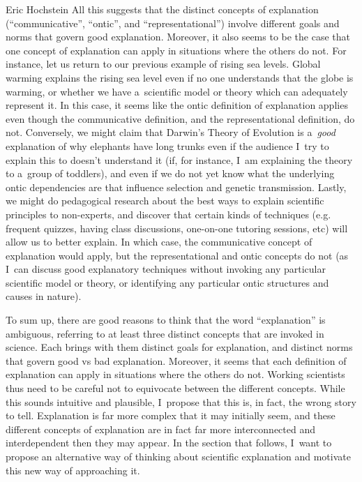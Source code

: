 \begin{artengenv}{Eric Hochstein}
All this suggests that the distinct concepts of explanation (``communicative'', ``ontic'', and ``representational'') involve different goals and norms that govern good explanation. Moreover, it also seems to be the case that one concept of explanation can apply in situations where the others do not. For instance, let us return to our previous example of rising sea levels. Global warming explains the rising sea level even if no one understands that the globe is warming, or whether we have a~scientific model or theory which can adequately represent it. In this case, it seems like the ontic definition of explanation applies even though the communicative definition, and the representational definition, do not. Conversely, we might claim that Darwin's Theory of Evolution is a~\textit{good} explanation of why elephants have long trunks even if the audience I~try to explain this to doesn't understand it (if, for instance, I~am explaining the theory to a~group of toddlers), and even if we do not yet know what the underlying ontic dependencies are that influence selection and genetic transmission. Lastly, we might do pedagogical research about the best ways to explain scientific principles to non-experts, and discover that certain kinds of techniques (e.g. frequent quizzes, having class discussions, one-on-one tutoring sessions, etc) will allow us to better explain. In which case, the communicative concept of explanation would apply, but the representational and ontic concepts do not (as I~can discuss good explanatory techniques without invoking any particular scientific model or theory, or identifying any particular ontic structures and causes in nature).

To sum up, there are good reasons to think that the word ``explanation'' is ambiguous, referring to at least three distinct concepts that are invoked in science. Each brings with them distinct goals for explanation, and distinct norms that govern good vs bad explanation. Moreover, it seems that each definition of explanation can apply in situations where the others do not. Working scientists thus need to be careful not to equivocate between the different concepts. While this sounds intuitive and plausible, I~propose that this is, in fact, the wrong story to tell. Explanation is far more complex that it may initially seem, and these different concepts of explanation are in fact far more interconnected and interdependent then they may appear. In the section that follows, I~want to propose an alternative way of thinking about scientific explanation and motivate this new way of approaching it.


\end{artengenv}
